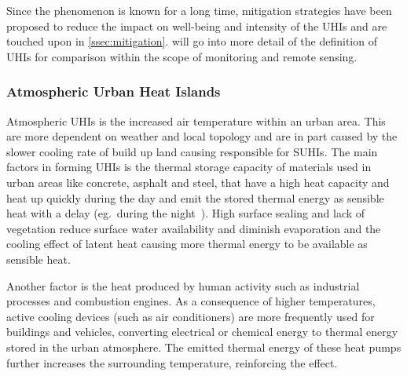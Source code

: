 \documentclass[12pt,a4paper, english,twoside]{scrartcl}
\begin{document}
    
    Since the phenomenon is known for a long time, mitigation strategies have been proposed to reduce the impact on well-being and intensity of the \glspl{UHI} and are touched upon in \cref{ssec:mitigation}.
     will go into more detail of the definition of \glspl{UHI} for comparison within the scope of monitoring and remote sensing. 
%
    \subsubsection{Atmospheric Urban Heat Islands}\label{sec:at_uhi}
      Atmospheric \glspl{UHI} is the increased air temperature within an urban area. 
      This are more dependent on weather and local topology and are in part caused by the slower cooling rate of build up land causing responsible for \glspl{SUHI}.
      The main factors in forming \glspl{UHI} is the thermal storage capacity of materials used in urban areas like concrete, asphalt and steel, that have a high heat capacity and heat up quickly during the day and emit the stored thermal energy as sensible heat with a delay (eg.~during the night~\autocite{Ramamurthy2014}).
      High surface sealing and lack of vegetation reduce surface water availability and diminish evaporation and the cooling effect of latent heat causing more thermal energy to be available as sensible heat. 

      Another factor is the heat produced by human activity such as industrial processes and combustion engines.
      As a consequence of higher temperatures, active cooling devices (such as air conditioners) are more frequently used for buildings and vehicles, converting electrical or chemical energy to thermal energy stored in the urban atmosphere. 
      The emitted thermal energy of these heat pumps further increases the surrounding temperature, reinforcing the effect.
      \\
      
\end{document}

